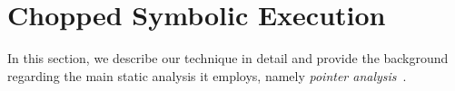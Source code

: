 
\chapter{Chopped Symbolic Execution}\label{chapter:design}

In this section, we describe our technique in detail and provide the
background regarding the main static analysis it employs, namely
\emph{pointer analysis}~\cite{andersen:pointeranalysis,
  Hind:Paste2001, Smaragdakis:FTPL2015}.













